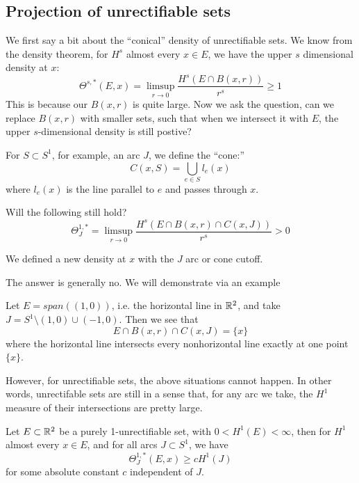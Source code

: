 \subsection{Projection of unrectifiable sets}
We first say a bit about the ``conical'' density of unrectifiable sets. We know from the density theorem, for $H^s$ almost every $x\in E$, we have the upper $s$ dimensional density at $x$:
\begin{equation*}
    \Theta^{s,*}(E,x)=\limsup_{r\to 0}\frac{H^s(E\cap B(x,r))}{r^s}\geq 1
\end{equation*}
This is because our $B(x,r)$ is quite large. Now we ask the question, can we replace $B(x,r)$ with smaller sets, such that when we intersect it with $E$, the upper $s$-dimensional density is still postive?
\begin{definition}[Cone]
    For $S\subset S^1$, for example, an arc $J$, we define the ``cone:''
    \begin{equation*}
        C(x,S)=\bigcup_{e\in S}l_e(x)
    \end{equation*}
    where $l_e(x)$ is the line parallel to $e$ and passes through $x$.
\end{definition}
\begin{problem}
    Will the following still hold? 
    \begin{equation*}
        \Theta_J^{1,*}=\limsup_{r\to 0}\frac{H^s(E\cap B(x,r)\cap C(x,J))}{r^s}>0
    \end{equation*}
\end{problem}
\begin{note}
    We defined a new density at $x$ with the $J$ arc or cone cutoff.
\end{note}
The answer is generally no. We will demonstrate via an example
\begin{example}
    Let $E=span((1,0))$, i.e. the horizontal line in $\mathbb{R}^2$, and take $J=S^1\setminus (1,0)\cup (-1, 0)$. Then we see that 
    \begin{equation*}
        E\cap B(x,r)\cap C(x,J)=\{x\}
    \end{equation*}
    where the horizontal line intersects every nonhorizontal line exactly at one point $\{x\}$.
\end{example}
However, for unrectifiable sets, the above situations cannot happen. In other words, unrectifable sets are still in a sense that, for any arc we take, the $H^1$ measure of their intersections are pretty large.
\begin{theorem}
    Let $E\subset\mathbb{R}^2$ be a purely 1-unrectifiable set, with $0<H^1(E)<\infty$, then for $H^1$ almost every $x\in E$, and for all arcs $J\subset S^1$, we have
    \begin{equation*}
        \Theta_J^{1,*}(E, x)\geq cH^1(J)
    \end{equation*}
    for some absolute constant $c$ independent of $J$.
\end{theorem}
